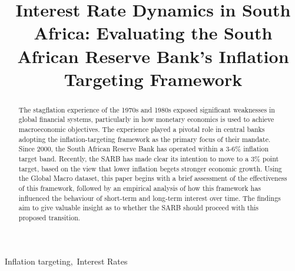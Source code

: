 \documentclass[11pt,preprint]{elsarticle}
\numberwithin{equation}{section}
\numberwithin{figure}{section}
\numberwithin{table}{section}
\begin{document}
\begin{frontmatter}  %

\title{Interest Rate Dynamics in South Africa: Evaluating the South
African Reserve Bank's Inflation Targeting Framework}












\begin{abstract}
\small{
The stagflation experience of the 1970s and 1980s exposed significant
weaknesses in global financial systems, particularly in how monetary
economics is used to achieve macroeconomic objectives. The experience
played a pivotal role in central banks adopting the inflation-targeting
framework as the primary focus of their mandate. Since 2000, the South
African Reserve Bank has operated within a 3-6\% inflation target band.
Recently, the SARB has made clear its intention to move to a 3\% point
target, based on the view that lower inflation begets stronger economic
growth. Using the Global Macro dataset, this paper begins with a brief
assessment of the effectiveness of this framework, followed by an
empirical analysis of how this framework has influenced the behaviour of
short-term and long-term interest over time. The findings aim to give
valuable insight as to whether the SARB should proceed with this
proposed transition.
}
\end{abstract}

\vspace{1cm}


\begin{keyword}
\footnotesize{
Inflation targeting,~Interest Rates \\
\vspace{0.3cm}
}
\end{keyword}



\vspace{0.5cm}

\end{frontmatter}

\setcounter{footnote}{0}



\pagestyle{fancy}
\chead{}
\rhead{}
\lfoot{}
\lhead{}
\cfoot{}
\end{document}
